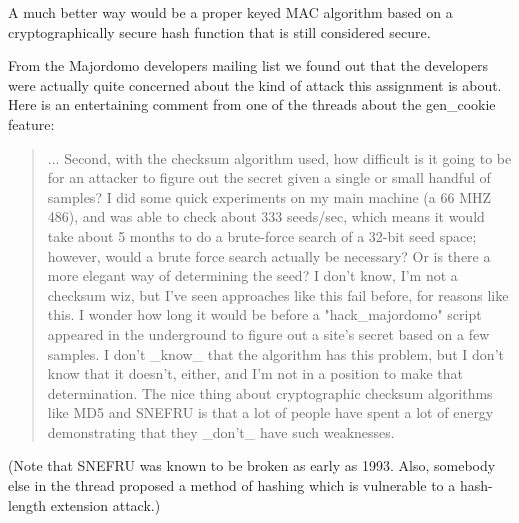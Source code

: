 \documentclass{article}
\begin{document}
A much better way would be a proper keyed MAC algorithm based on a cryptographically secure hash function that is still considered secure.

From the Majordomo developers mailing list we found out that the developers were actually quite concerned about the kind of attack this assignment is about.
Here is an entertaining comment from one of the threads about the gen\_cookie feature:
\begin{quotation}
	...
	Second, with the checksum algorithm used, how difficult is it going to be
	for an attacker to figure out the secret given a single or small handful of
	samples?  I did some quick experiments on my main machine (a 66 MHZ 486),
	and was able to check about 333 seeds/sec, which means it would take about
	5 months to do a brute-force search of a 32-bit seed space; however, would
	a brute force search actually be necessary?  Or is there a more elegant way
	of determining the seed?  I don't know, I'm not a checksum wiz, but I've
	seen approaches like this fail before, for reasons like this.  I wonder how
	long it would be before a "hack\_majordomo" script appeared in the
	underground to figure out a site's secret based on a few samples.  I don't
	\_know\_ that the algorithm has this problem, but I don't know that it
	doesn't, either, and I'm not in a position to make that determination.  The
	nice thing about cryptographic checksum algorithms like MD5 and SNEFRU is
	that a lot of people have spent a lot of energy demonstrating that they
	\_don't\_ have such weaknesses.
\end{quotation}
\cite{majordomo_thread}
(Note that SNEFRU was known to be broken as early as 1993. Also, somebody else in the thread proposed a method of hashing which is vulnerable to a hash-length extension attack.)

\section{}



 
\end{document}
